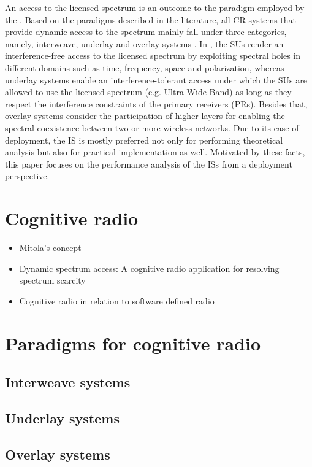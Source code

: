 An access to the licensed spectrum is an outcome to the paradigm employed by the . Based on the paradigms described in the literature, all CR systems that provide dynamic access to the spectrum mainly fall under three categories, namely, interweave, underlay and overlay systems \cite{Goldsmith09}. In , the SUs render an interference-free access to the licensed spectrum by exploiting spectral holes in different domains such as time, frequency, space and polarization, whereas underlay systems enable an interference-tolerant access under which the SUs are allowed to use the licensed spectrum (e.g. Ultra Wide Band) as long as they respect the interference constraints of the primary receivers (PRs). Besides that, overlay systems consider the participation of higher layers for enabling the spectral coexistence between two or more wireless networks. Due to its ease of deployment, the IS is mostly preferred not only for performing theoretical analysis but also for practical implementation as well. Motivated by these facts, this paper focuses on the performance analysis of the ISs from a deployment perspective. 

\section{Cognitive radio}
\begin{itemize}
\item Mitola's concept
\item Dynamic spectrum access: A cognitive radio application for resolving spectrum scarcity
\item Cognitive radio in relation to software defined radio
\end{itemize}

\section{Paradigms for cognitive radio}
\subsection{Interweave systems}
\subsection{Underlay systems}
\subsection{Overlay systems}



